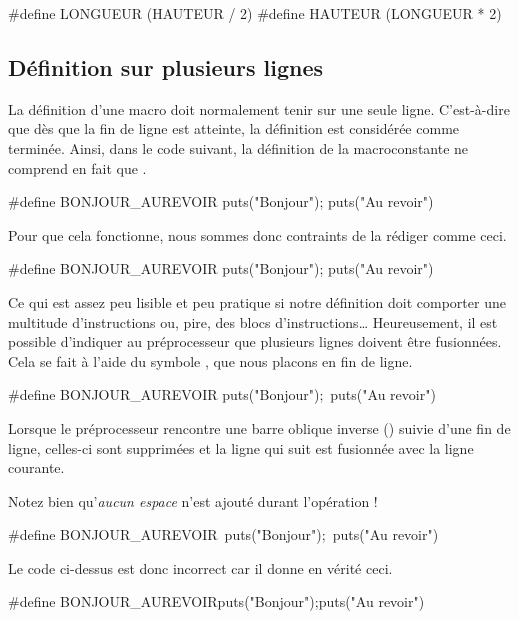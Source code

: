 \begin{C}
#define LONGUEUR (HAUTEUR / 2)
#define HAUTEUR (LONGUEUR * 2)
\end{C}

\subsection{Définition sur plusieurs lignes}
\label{definition-sur-plusieurs-lignes}

La définition d'une macro doit normalement tenir sur une seule ligne.
C'est-à-dire que dès que la fin de ligne est atteinte, la définition est
considérée comme terminée. Ainsi, dans le code suivant, la définition de
la macroconstante  ne comprend en fait que
.

\begin{C}
#define BONJOUR_AUREVOIR puts("Bonjour");
puts("Au revoir")
\end{C}

Pour que cela fonctionne, nous sommes donc contraints de la rédiger
comme ceci.

\begin{C}
#define BONJOUR_AUREVOIR puts("Bonjour"); puts("Au revoir")
\end{C}

Ce qui est assez peu lisible et peu pratique si notre définition doit
comporter une multitude d'instructions ou, pire, des blocs
d'instructions\ldots{} Heureusement, il est possible d'indiquer au
préprocesseur que plusieurs lignes doivent être fusionnées. Cela se fait
à l'aide du symbole \mybox{\textbackslash{}}, que nous placons en fin
de ligne.

\begin{C}
#define BONJOUR_AUREVOIR puts("Bonjour");\
puts("Au revoir")
\end{C}

Lorsque le préprocesseur rencontre une barre oblique inverse
(\mybox{\textbackslash{}}) suivie d'une fin de ligne, celles-ci sont
supprimées et la ligne qui suit est fusionnée avec la ligne courante.

\begin{attentionbox}
  Notez bien qu'\emph{aucun espace} n'est
ajouté durant l'opération ! 
\begin{C}
#define BONJOUR_AUREVOIR\
puts("Bonjour");\
puts("Au revoir")                         
\end{C}
Le code ci-dessus est donc incorrect car il donne
en vérité ceci.
\begin{C}
 #define BONJOUR_AUREVOIRputs("Bonjour");puts("Au revoir")
\end{C}
\end{attentionbox}

